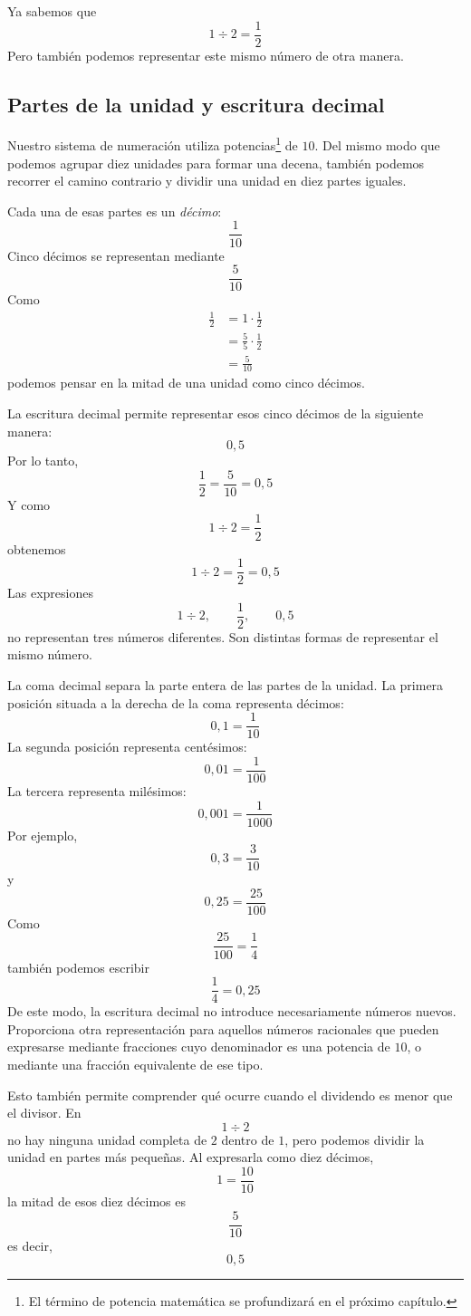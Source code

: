 Ya sabemos que
\[
1\div2=\frac12
\]
Pero también podemos representar este mismo número de otra manera.

\subsection{Partes de la unidad y escritura decimal}

Nuestro sistema de numeración utiliza potencias\footnote{El término de potencia matemática se profundizará en el próximo capítulo.} de \(10\). Del mismo modo que podemos agrupar diez unidades para formar una decena, también podemos recorrer el camino contrario y dividir una unidad en diez partes iguales.

Cada una de esas partes es un \emph{décimo}:
\[
\frac{1}{10}
\]
Cinco décimos se representan mediante
\[
\frac{5}{10}
\]
Como
\begin{align*}
  \frac12&=1\cdot\frac{1}{2}\\
  &=\frac55\cdot\frac12\\ 
  &=\frac{5}{10}
\end{align*}
podemos pensar en la mitad de una unidad como cinco décimos.

La escritura decimal permite representar esos cinco décimos de la siguiente manera:
\[
0{,}5
\]
Por lo tanto,
\[
\frac12=\frac{5}{10}=0{,}5
\]
Y como
\[
1\div2=\frac12
\]
obtenemos
\[
\boxed{
1\div2=\frac12=0{,}5
}
\]
Las expresiones
\[
1\div2,\qquad \frac12,\qquad 0{,}5
\]
no representan tres números diferentes. Son distintas formas de representar el mismo número.

La coma decimal separa la parte entera de las partes de la unidad. La primera posición situada a la derecha de la coma representa décimos:
\[
0{,}1=\frac{1}{10}
\]
La segunda posición representa centésimos:
\[
0{,}01=\frac{1}{100}
\]
La tercera representa milésimos:
\[
0{,}001=\frac{1}{1000}
\]
Por ejemplo,
\[
0{,}3=\frac{3}{10}
\]
y
\[
0{,}25=\frac{25}{100}
\]
Como
\[
\frac{25}{100}=\frac14
\]
también podemos escribir
\[
\frac14=0{,}25
\]
De este modo, la escritura decimal no introduce necesariamente números nuevos. Proporciona otra representación para aquellos números racionales que pueden expresarse mediante fracciones cuyo denominador es una potencia de \(10\), o mediante una fracción equivalente de ese tipo.

Esto también permite comprender qué ocurre cuando el dividendo es menor que el divisor. En
\[
1\div2
\]
no hay ninguna unidad completa de \(2\) dentro de \(1\), pero podemos dividir la unidad en partes más pequeñas. Al expresarla como diez décimos,
\[
1=\frac{10}{10}
\]
la mitad de esos diez décimos es
\[
\frac{5}{10}
\]
es decir,
\[
0{,}5
\]

